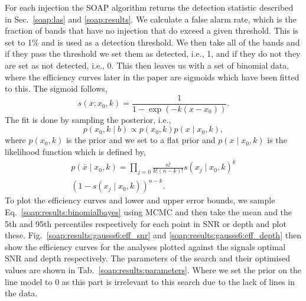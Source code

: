 %
%
For each injection the SOAP algorithm returns the detection statistic described in Sec.~\ref{soap:las} and \ref{soap:results}.
We calculate a false alarm rate, which is the fraction of bands that have no injection that do exceed a given threshold. This is set to 1\% and is used as a detection threshold.
We then take all of the bands and if they pass the threshold we set them as detected, i.e., 1, and if they do not they are set as not detected, i.e., 0.
This then leaves us with a set of binomial data, where the efficiency curves later in the paper are sigmoids which have been fitted to this.
The sigmoid follows,
\begin{equation}
s(x; x_0, k)  = \frac{1}{1-\exp{(-k(x - x_0))}}.
\end{equation}
The fit is done by sampling the posterior, i.e.,
\begin{equation}
\label{soap:results:binomialbayes}
p(x_0, k \mid b) \propto  p(x_0,k)p(x \mid x_0, k),
\end{equation}
where $p(x_0,k)$ is the prior and we set to a flat prior and $p(x \mid x_0, k)$ is the likelihood function which is defined by,
\begin{equation}
\begin{split}
p(\bar{x} \mid x_0, k) = \prod_{j=0}\frac{n!}{k!(n-k)!}s(x_j \mid x_0, k)^{k} \\ (1-s(x_j \mid x_0,k))^{n-k}.
\end{split}
\end{equation}
To plot the efficiency curves and lower and upper error bounds, we sample Eq.~\ref{soap:results:binomialbayes} using \gls{MCMC} and then take the mean and the 5th and 95th percentiles respectively for each point in SNR or depth and plot these.
Fig.~\ref{soap:results:gausss6:eff_snr} and  \ref{soap:results:gausss6:eff_depth} then show the efficiency curves for the analyses plotted against the signals optimal \gls{SNR} and depth respectively.
The parameters of the search and their optimised values are shown in Tab.~\ref{soap:results:parameters}. Where we set the prior on the line model to 0 as this part is irrelevant to this search due to the lack of lines in the data.


